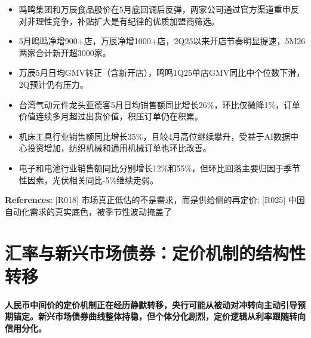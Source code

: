 \documentclass[11pt]{ctexart}
\begin{document}
\begin{itemize}
  \item 鸣鸣集团和万辰食品股价在5月底回调后反弹，两家公司通过官方渠道重申反对非理性竞争，补贴扩大是有纪律的优质加盟商筛选。
  \item 5月鸣鸣净增900+店，万辰净增1000+店，2Q25以来开店节奏明显提速，5M26两家合计新开超3000家。
  \item 万辰5月日均GMV转正（含新开店），鸣鸣1Q25单店GMV同比中个位数下滑，2Q预计仍有压力。
  \item 台湾气动元件龙头亚德客5月日均销售额同比增长26\%，环比仅微降1\%，订单价值连续多月超过出货价值，积压订单仍在积累。
  \item 机床工具行业销售额同比增长35\%，且较4月高位继续攀升，受益于AI数据中心投资增加，纺织机械和通用机械订单也环比改善。
  \item 电子和电池行业销售额同比分别增长12\%和55\%，但环比回落主要归因于季节性因素，光伏相关同比-5\%继续走弱。
\end{itemize}
{\small\color{refgray}\textbf{References:} [R018] 市场真正低估的不是需求，而是供给侧的再定价; [R025] 中国自动化需求的真实底色，被季节性波动掩盖了}

\section{汇率与新兴市场债券：定价机制的结构性转移}
\textbf{人民币中间价的定价机制正在经历静默转移，央行可能从被动对冲转向主动引导预期锚定。新兴市场债券曲线整体持稳，但个体分化剧烈，定价逻辑从利率跟随转向信用分化。}
\end{document}
